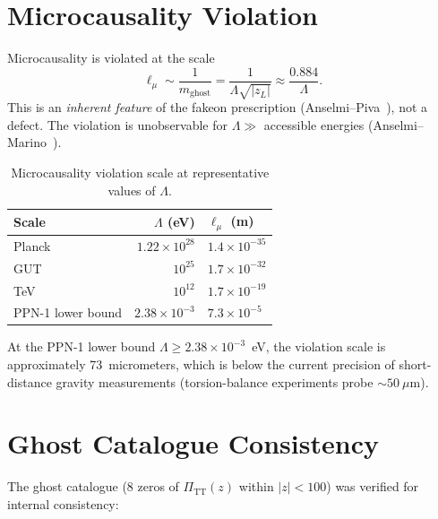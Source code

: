 \documentclass[11pt,a4paper]{article}
\newcommand{\PiTT}{\Pi_{\mathrm{TT}}}
\newcommand{\Lam}{\Lambda}
\begin{document}
\section{Microcausality Violation}
\label{sec:microcausality}

Microcausality is violated at the scale
\begin{equation}\label{eq:micro-scale}
  \ell_{\mu} \sim \frac{1}{m_{\mathrm{ghost}}} = \frac{1}{\Lam\sqrt{|z_L|}}
  \approx \frac{0.884}{\Lam}.
\end{equation}
This is an \emph{inherent feature} of the fakeon prescription
(Anselmi--Piva~\cite{AnselmiPiva2018}), not a defect.
The violation is unobservable for $\Lam \gg$ accessible energies
(Anselmi--Marino~\cite{AnselmiMarino2019}).

\begin{table}[htbp]
\centering
\caption{Microcausality violation scale at representative values of $\Lam$.}
\label{tab:micro-scales}
\begin{tabular}{@{}lrl@{}}
\toprule
Scale & $\Lam$ (eV) & $\ell_\mu$ (m) \\
\midrule
Planck         & $1.22 \times 10^{28}$ & $1.4 \times 10^{-35}$ \\
GUT            & $10^{25}$ & $1.7 \times 10^{-32}$ \\
TeV            & $10^{12}$ & $1.7 \times 10^{-19}$ \\
PPN-1 lower bound & $2.38 \times 10^{-3}$ & $7.3 \times 10^{-5}$ \\
\bottomrule
\end{tabular}
\end{table}

At the PPN-1 lower bound $\Lam \geq 2.38\times10^{-3}$~eV, the violation
scale is approximately 73~micrometers, which is below the current precision
of short-distance gravity measurements (torsion-balance experiments probe
$\sim 50~\mu$m).

\section{Ghost Catalogue Consistency}
\label{sec:ghost-catalogue}

The ghost catalogue (8 zeros of $\PiTT(z)$ within $|z| < 100$) was verified
for internal consistency:
\end{document}
